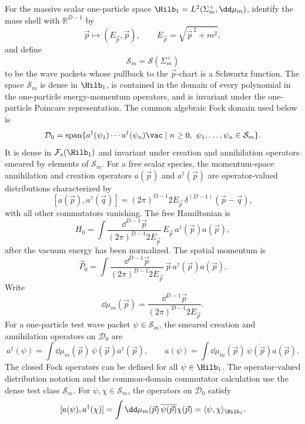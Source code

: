 \begin{definition}
\label{def:mass-shell-fock-test-domain-kernels}
For the massive scalar one-particle space
\(\Hilb_1=L^2(\Sigma_m^+,\dd\mu_m)\), identify the mass shell with
\(\mathbb R^{D-1}\) by
\[
  \vec p\longmapsto (E_{\vec p},\vec p),
  \qquad E_{\vec p}=\sqrt{\vec p^{\,2}+m^2},
\]
and define
\[
  \mathcal S_m=\mathcal S(\Sigma_m^+)
\]
to be the wave packets whose pullback to the \(\vec p\)-chart is a Schwartz
function.  The space \(\mathcal S_m\) is dense in \(\Hilb_1\), is contained in
the domain of every polynomial in the one-particle energy-momentum operators,
and is invariant under the one-particle Poincare representation.  The common
algebraic Fock domain used below is
\[
  \mathcal D_0
  =
  \operatorname{span}\{
    a^\dagger(\psi_1)\cdots a^\dagger(\psi_n)\vac
    \mid
    n\ge0,\ \psi_1,\ldots,\psi_n\in\mathcal S_m
  \}.
\]
It is dense in \(\mathcal F_s(\Hilb_1)\) and invariant under creation and
annihilation operators smeared by elements of \(\mathcal S_m\).
For a free scalar species, the momentum-space annihilation and creation
operators \(a(\vec p)\) and \(a^\dagger(\vec p)\) are operator-valued
distributions characterized by
\[
  [a(\vec p),a^\dagger(\vec q)]
  =
  (2\pi)^{D-1}2E_{\vec p}\,\delta^{(D-1)}(\vec p-\vec q),
\]
with all other commutators vanishing. The free Hamiltonian is
\[
  H_0
  =
  \int
  \frac{\dd^{D-1}\vec p}{(2\pi)^{D-1}2E_{\vec p}}\,
  E_{\vec p}\,a^\dagger(\vec p)a(\vec p),
\]
after the vacuum energy has been normalized.
The spatial momentum is
\[
  \vec P_0
  =
  \int
  \frac{\dd^{D-1}\vec p}{(2\pi)^{D-1}2E_{\vec p}}\,
  \vec p\,a^\dagger(\vec p)a(\vec p).
\]
Write
\[
  \dd\mu_m(\vec p)
  =
  \frac{\dd^{D-1}\vec p}{(2\pi)^{D-1}2E_{\vec p}} .
\]
For a one-particle test wave packet \(\psi\in\mathcal S_m\), the smeared
creation and annihilation operators on \(\mathcal D_0\) are
\[
  a^\dagger(\psi)
  =
  \int \dd\mu_m(\vec p)\,\psi(\vec p)a^\dagger(\vec p),
  \qquad
  a(\psi)
  =
  \int \dd\mu_m(\vec p)\,\overline{\psi(\vec p)}a(\vec p).
\]
The closed Fock operators can be defined for all \(\psi\in\Hilb_1\).  The
operator-valued distribution notation and the common-domain commutator
calculation use the dense test class \(\mathcal S_m\).  For
\(\psi,\chi\in\mathcal S_m\), the operators on \(\mathcal D_0\) satisfy
\[
  [a(\psi),a^\dagger(\chi)]
  =
  \int \dd\mu_m(\vec p)\,\overline{\psi(\vec p)}\chi(\vec p)
  =
  \langle\psi,\chi\rangle_{\Hilb_1}.
\]
\end{definition}

